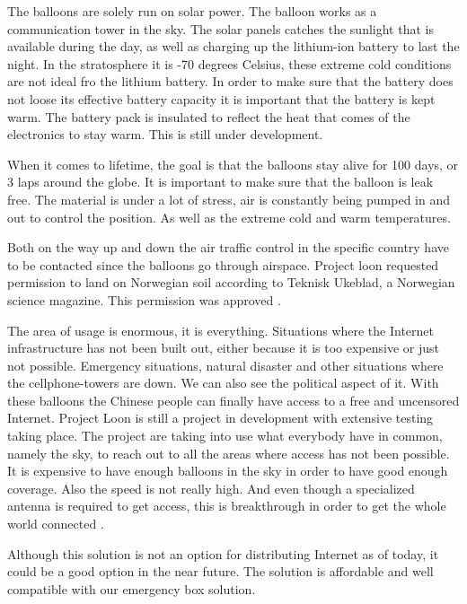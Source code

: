 The balloons are solely run on solar power. The balloon works as a communication tower in the sky. The solar panels catches the sunlight that is available during the day, as well as charging up the lithium-ion battery to last the night. In the stratosphere it is -70 degrees Celsius, these extreme cold conditions are not ideal fro the lithium battery. In order to make sure that the battery does not loose its effective battery capacity it is important that the battery is kept warm. The battery pack is insulated to reflect the heat that comes of the electronics to stay warm. This is still under development. 

When it comes to lifetime, the goal is that the balloons stay alive for 100 days, or 3 laps around the globe. It is important to make sure that the balloon is leak free. The material is under a lot of stress, air is constantly being pumped in and out to control the position. As well as the extreme cold and warm temperatures. 

Both on the way up and down the air traffic control in the specific country have to be contacted since the balloons go through airspace. Project loon requested permission to land on Norwegian soil according to Teknisk Ukeblad, a Norwegian science magazine. This permission was approved \cite{loonTU}.

The area of usage is enormous, it is everything. Situations where the Internet infrastructure has not been built out, either because it is too expensive or just not possible. Emergency situations, natural disaster and other situations where the cellphone-towers are down. We can also see the political aspect of it. With these balloons the Chinese people can finally have access to a free and uncensored Internet. Project Loon is still a project in development with extensive testing taking place. The project are taking into use what everybody have in common, namely the sky, to reach out to all the areas where access has not been possible. It is expensive to have enough balloons in the sky in order to have good enough coverage. Also the speed is not really high. And even though a specialized antenna is required to get access, this is breakthrough in order to get the whole world connected \cite{loonYouTube, loonNorsk}.

Although this solution is not an option for distributing Internet as of today, it could be a good option in the near future. The solution is affordable and well compatible with our emergency box solution.


